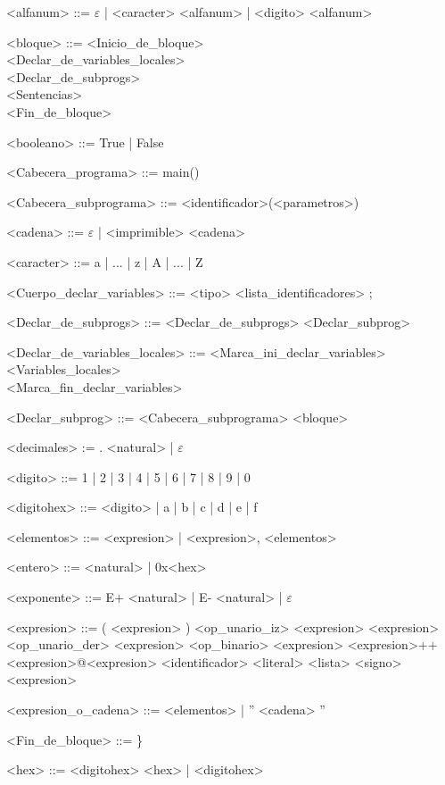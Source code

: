 \setlength{\grammarparsep}{4pt plus 1pt minus 1pt}

\begin{grammar}

<alfanum> ::= $\varepsilon$ | <caracter> <alfanum> | <digito> <alfanum>

<bloque> ::= <Inicio_de_bloque> \\
 <Declar_de_variables_locales> \\
 <Declar_de_subprogs> \\
 <Sentencias> \\
 <Fin_de_bloque>

<booleano> ::= True | False

<Cabecera_programa> ::= main()

<Cabecera_subprograma> ::= <identificador>(<parametros>)

<cadena> ::= $\varepsilon$ | <imprimible> <cadena>

<caracter> ::= a | ... | z | A | ... | Z

<Cuerpo_declar_variables> ::= <tipo> <lista_identificadores> ;

<Declar_de_subprogs> ::= <Declar_de_subprogs> <Declar_subprog>

<Declar_de_variables_locales> ::= <Marca_ini_declar_variables> \\
<Variables_locales> \\
<Marca_fin_declar_variables>

<Declar_subprog> ::= <Cabecera_subprograma> <bloque>

<decimales> := . <natural> | $\varepsilon$

<digito> ::= 1 | 2 | 3 | 4 | 5 | 6 | 7 | 8 | 9 | 0

<digitohex> ::= <digito> | a | b | c | d | e | f

<elementos> ::= <expresion> | <expresion>, <elementos>

<entero> ::= <natural> | 0x<hex>

<exponente> ::= E+ <natural> | E- <natural> | $\varepsilon$

<expresion> ::= ( <expresion> )
\alt <op_unario_iz> <expresion>
\alt <expresion> <op_unario_der>
\alt <expresion> <op_binario> <expresion>
\alt <expresion>++<expresion>@<expresion>
\alt <identificador>
\alt <literal>
\alt <lista>
\alt <signo> <expresion>

<expresion_o_cadena> ::= <elementos> | '' <cadena> ''

<Fin_de_bloque> ::= \}

<hex> ::= <digitohex> <hex> | <digitohex>


\end{grammar}

